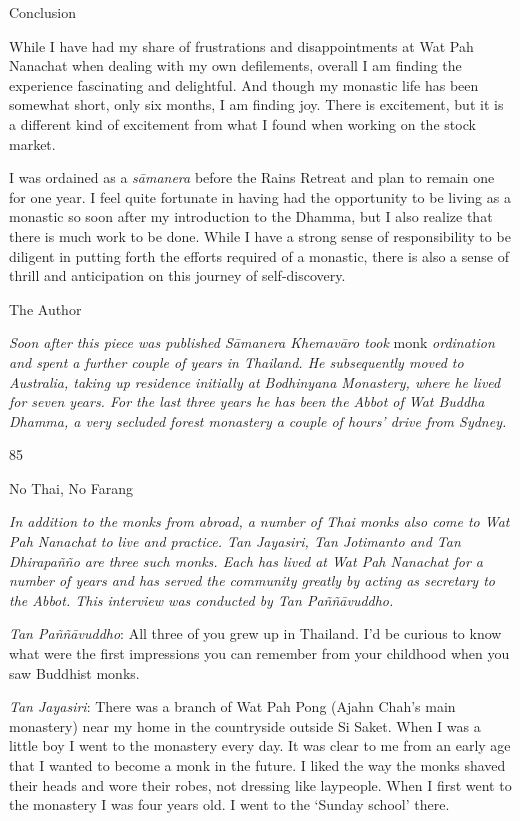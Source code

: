 Conclusion

While I have had my share of frustrations and disappointments at Wat Pah
Nanachat when dealing with my own defilements, overall I am finding the
experience fascinating and delightful. And though my monastic life has
been somewhat short, only six months, I am finding joy. There is
excitement, but it is a different kind of excitement from what I found
when working on the stock market.

I was ordained as a \emph{sāmanera} before the Rains Retreat and plan to
remain one for one year. I feel quite fortunate in having had the
opportunity to be living as a monastic so soon after my introduction to
the Dhamma, but I also realize that there is much work to be done. While
I have a strong sense of responsibility to be diligent in putting forth
the efforts required of a monastic, there is also a sense of thrill and
anticipation on this journey of self-discovery.

The Author

\emph{Soon after this piece was published Sāmanera Khemavāro took} monk
\emph{ordination and spent a further couple of years in Thailand. He
subsequently moved to Australia, taking up residence initially at
Bodhinyana Monastery, where he lived for seven years. For the last three
years he has been the Abbot of Wat Buddha Dhamma, a very secluded forest
monastery a couple of hours' drive from Sydney.}

85

No Thai, No Farang

\emph{In addition to the monks from abroad, a number of Thai monks also
come to Wat Pah Nanachat to live and practice. Tan Jayasiri, Tan
Jotimanto and Tan Dhirapañño are three such monks. Each has lived at Wat
Pah Nanachat for a number of years and has served the community greatly
by acting as secretary to the Abbot. This interview was conducted by Tan
Paññāvuddho.}

\emph{Tan Paññāvuddho}: All three of you grew up in Thailand. I'd be
curious to know what were the first impressions you can remember from
your childhood when you saw Buddhist monks.

\emph{Tan Jayasiri}: There was a branch of Wat Pah Pong (Ajahn Chah's
main monastery) near my home in the countryside outside Si Saket. When I
was a little boy I went to the monastery every day. It was clear to me
from an early age that I wanted to become a monk in the future. I liked
the way the monks shaved their heads and wore their robes, not dressing
like laypeople. When I first went to the monastery I was four years old.
I went to the `Sunday school' there.

